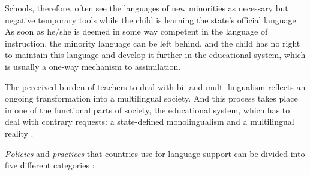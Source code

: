 \documentclass[output=paper,colorlinks,citecolor=brown]{langscibook}
\begin{document}
Schools, therefore, often see the languages of new minorities as necessary but negative temporary tools while the child is learning the state's official language \citep{skutnabb-kangas2008}. As soon as he/she is deemed in some way competent in the language of instruction, the minority language can be left behind, and the child has no right to maintain this language and develop it further in the educational system, which is usually a one-way mechanism to assimilation.

The perceived burden of teachers to deal with bi- and multi-lingualism reflects an ongoing transformation into a multilingual society. And this process takes place in one of the functional parts of society, the educational system, which has to deal with contrary requests: a state-defined monolingualism and a multilingual reality \citep{decarlo2005}.

\textit{Policies} and \textit{practices} that countries use for language support can be divided into five different categories \citep{christensen_stanat2007}:
\end{document}
